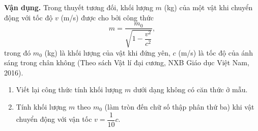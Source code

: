 \begin{lesson}
    \textbf{Vận dụng.} Trong thuyết tương đối, khối lượng $m$ (kg) của một vật khi chuyển động với tốc độ $v$ (m/s) được cho bởi công thức
    \[
        m=\dfrac{m_0}{\sqrt{1-\dfrac{v^2}{c^2}}},
    \]
    trong đó $m_0$ (kg) là khối lượng của vật khi đứng yên, $c$ (m/s) là tốc độ của ánh sáng trong chân không (Theo sách Vật lí đại cương, NXB Giáo dục Việt Nam, 2016).
    \begin{enumerate}[label=\alph*)]
        \item Viết lại công thức tính khối lượng $m$ dưới dạng không có căn thức ở mẫu.
        \item Tính khối lượng $m$ theo $m_0$ (làm tròn đến chữ số thập phân thứ ba) khi vật chuyển động với vận tốc $v=\dfrac1{10}c$.
    \end{enumerate}

    \answerline
    \answerline
\end{lesson}

